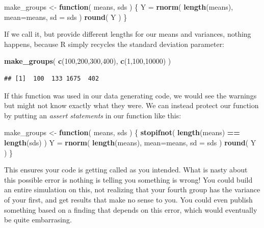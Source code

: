 \documentclass[
]{book}
\newenvironment{Shaded}{\begin{snugshade}}{\end{snugshade}}
\newcommand{\AttributeTok}[1]{\textcolor[rgb]{0.13,0.29,0.53}{#1}}
\newcommand{\ControlFlowTok}[1]{\textcolor[rgb]{0.13,0.29,0.53}{\textbf{#1}}}
\newcommand{\DecValTok}[1]{\textcolor[rgb]{0.00,0.00,0.81}{#1}}
\newcommand{\FunctionTok}[1]{\textcolor[rgb]{0.13,0.29,0.53}{\textbf{#1}}}
\newcommand{\NormalTok}[1]{#1}
\newcommand{\OtherTok}[1]{\textcolor[rgb]{0.56,0.35,0.01}{#1}}
\newcommand{\SpecialCharTok}[1]{\textcolor[rgb]{0.81,0.36,0.00}{\textbf{#1}}}
\begin{document}
\begin{Shaded}
\begin{Highlighting}[]
\NormalTok{make\_groups }\OtherTok{\textless{}{-}} \ControlFlowTok{function}\NormalTok{( means, sds ) \{}
\NormalTok{  Y }\OtherTok{=} \FunctionTok{rnorm}\NormalTok{( }\FunctionTok{length}\NormalTok{(means), }\AttributeTok{mean=}\NormalTok{means, }\AttributeTok{sd =}\NormalTok{ sds )}
  \FunctionTok{round}\NormalTok{( Y )}
\NormalTok{\}}
\end{Highlighting}
\end{Shaded}

If we call it, but provide different lengths for our means and variances, nothing happens, because R simply recycles the standard deviation parameter:

\begin{Shaded}
\begin{Highlighting}[]
\FunctionTok{make\_groups}\NormalTok{( }\FunctionTok{c}\NormalTok{(}\DecValTok{100}\NormalTok{,}\DecValTok{200}\NormalTok{,}\DecValTok{300}\NormalTok{,}\DecValTok{400}\NormalTok{), }\FunctionTok{c}\NormalTok{(}\DecValTok{1}\NormalTok{,}\DecValTok{100}\NormalTok{,}\DecValTok{10000}\NormalTok{) )}
\end{Highlighting}
\end{Shaded}

\begin{verbatim}
## [1]  100  133 1675  402
\end{verbatim}

If this function was used in our data generating code, we would see the warnings but might not know exactly what they were.
We can instead protect our function by putting an \emph{assert statements} in our function like this:

\begin{Shaded}
\begin{Highlighting}[]
\NormalTok{make\_groups }\OtherTok{\textless{}{-}} \ControlFlowTok{function}\NormalTok{( means, sds ) \{}
  \FunctionTok{stopifnot}\NormalTok{( }\FunctionTok{length}\NormalTok{(means) }\SpecialCharTok{==} \FunctionTok{length}\NormalTok{(sds) )}
\NormalTok{  Y }\OtherTok{=} \FunctionTok{rnorm}\NormalTok{( }\FunctionTok{length}\NormalTok{(means), }\AttributeTok{mean=}\NormalTok{means, }\AttributeTok{sd =}\NormalTok{ sds )}
  \FunctionTok{round}\NormalTok{( Y )}
\NormalTok{\}}
\end{Highlighting}
\end{Shaded}

This ensures your code is getting called as you intended.
What is nasty about this possible error is nothing is telling you something is wrong!
You could build an entire simulation on this, not realizing that your fourth group has the variance of your first, and get results that make no sense to you.
You could even publish something based on a finding that depends on this error, which would eventually be quite embarrasing.
\end{document}
